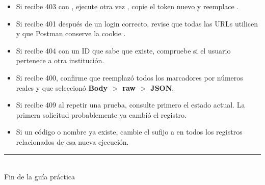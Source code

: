 \documentclass[11pt,a4paper]{article}
\begin{document}
\begin{itemize}
  \item Si recibe 403 con , ejecute otra vez , copie el token nuevo y reemplace .
  \item Si recibe 401 después de un login correcto, revise que todas las URLs utilicen  y que Postman conserve la cookie .
  \item Si recibe 404 con un ID que sabe que existe, compruebe si el usuario pertenece a otra institución.
  \item Si recibe 400, confirme que reemplazó todos los marcadores  por números reales y que seleccionó \textbf{Body $>$ raw $>$ JSON}.
  \item Si recibe 409 al repetir una prueba, consulte primero el estado actual. La primera solicitud probablemente ya cambió el registro.
  \item Si un código o nombre  ya existe, cambie el sufijo a  en todos los registros relacionados de esa nueva ejecución.
\end{itemize}

\vfill
\begin{center}
\textcolor{AzulSipeip}{\rule{0.65\textwidth}{0.5pt}}\\
\small Fin de la guía práctica
\end{center}
\end{document}
